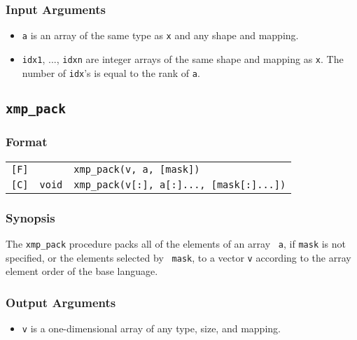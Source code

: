 \subsubsection*{Input Arguments}
\begin{itemize}
 \item {\tt a} is an array of the same type as {\tt x} and any shape
       and mapping.
 \item {\tt idx1}, ..., {\tt idxn} are integer arrays of the same
       shape and mapping as {\tt x}. The number of {\tt idx}'s is
       equal to the rank of {\tt a}.
\end{itemize}


\subsection{\tt xmp\_pack}
\label{155236_16Jan17}

\subsubsection*{Format}

\begin{tabular}{lll}

\verb![F]!&            & {\tt xmp\_pack(v, a, [mask])}\\

\verb![C]!& {\tt void} & {\tt xmp\_pack(v[:], a[:]..., [mask[:]...])}\\

\end{tabular}

\subsubsection*{Synopsis}

The {\tt xmp\_pack} procedure packs all of the elements of an array {\tt
a}, if {\tt mask} is not specified, or the elements selected by {\tt
mask}, to a vector {\tt v} according to the array element order of the
base language.

\subsubsection*{Output Arguments}
\begin{itemize}
 \item {\tt v} is a one-dimensional array of any type, size, and
       mapping.
\end{itemize}

